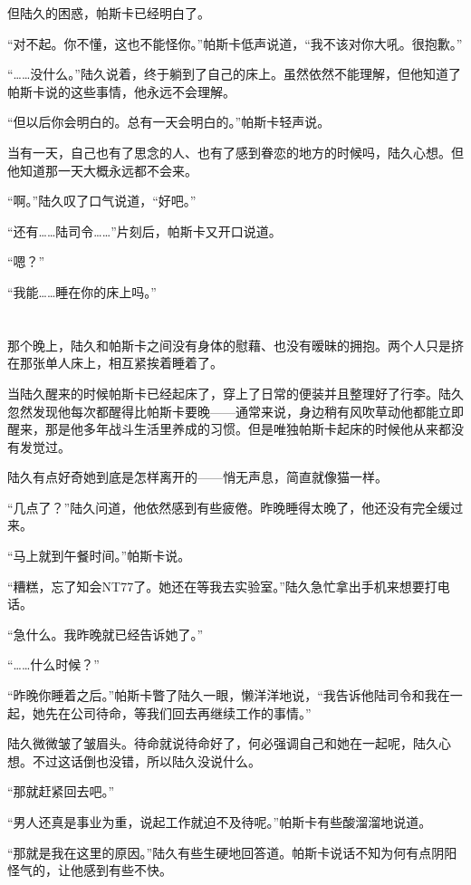 但陆久的困惑，帕斯卡已经明白了。

“对不起。你不懂，这也不能怪你。”帕斯卡低声说道，“我不该对你大吼。很抱歉。”

“……没什么。”陆久说着，终于躺到了自己的床上。虽然依然不能理解，但他知道了帕斯卡说的这些事情，他永远不会理解。

“但以后你会明白的。总有一天会明白的。”帕斯卡轻声说。

当有一天，自己也有了思念的人、也有了感到眷恋的地方的时候吗，陆久心想。但他知道那一天大概永远都不会来。

“啊。”陆久叹了口气说道，“好吧。”

“还有……陆司令……”片刻后，帕斯卡又开口说道。

“嗯？”

“我能……睡在你的床上吗。”

\section*{}

那个晚上，陆久和帕斯卡之间没有身体的慰藉、也没有暧昧的拥抱。两个人只是挤在那张单人床上，相互紧挨着睡着了。

当陆久醒来的时候帕斯卡已经起床了，穿上了日常的便装并且整理好了行李。陆久忽然发现他每次都醒得比帕斯卡要晚——通常来说，身边稍有风吹草动他都能立即醒来，那是他多年战斗生活里养成的习惯。但是唯独帕斯卡起床的时候他从来都没有发觉过。

陆久有点好奇她到底是怎样离开的——悄无声息，简直就像猫一样。

“几点了？”陆久问道，他依然感到有些疲倦。昨晚睡得太晚了，他还没有完全缓过来。

“马上就到午餐时间。”帕斯卡说。

“糟糕，忘了知会NT77了。她还在等我去实验室。”陆久急忙拿出手机来想要打电话。

“急什么。我昨晚就已经告诉她了。”

“……什么时候？”

“昨晚你睡着之后。”帕斯卡瞥了陆久一眼，懒洋洋地说，“我告诉他陆司令和我在一起，她先在公司待命，等我们回去再继续工作的事情。”

陆久微微皱了皱眉头。待命就说待命好了，何必强调自己和她在一起呢，陆久心想。不过这话倒也没错，所以陆久没说什么。

“那就赶紧回去吧。”

“男人还真是事业为重，说起工作就迫不及待呢。”帕斯卡有些酸溜溜地说道。

“那就是我在这里的原因。”陆久有些生硬地回答道。帕斯卡说话不知为何有点阴阳怪气的，让他感到有些不快。

